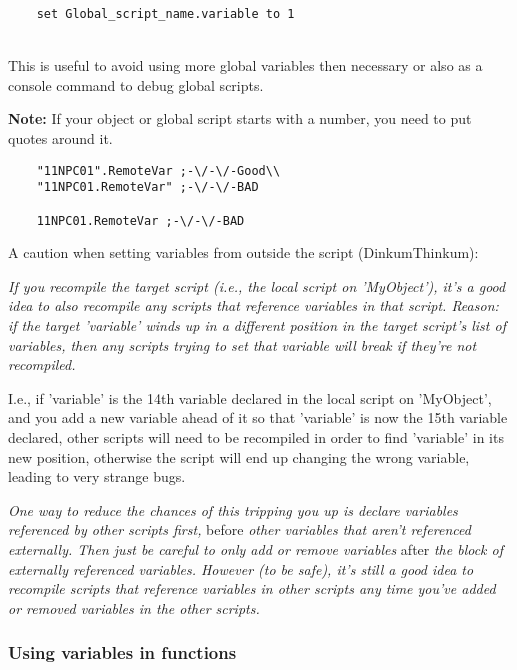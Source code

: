 \begin{lstlisting}
	set Global_script_name.variable to 1
\end{lstlisting}

\strut \\
This is useful to avoid using more global variables then necessary or
also as a console command to debug global scripts.

\textbf{Note:} If your object or global script starts with a number, you
need to put quotes around it.

\begin{lstlisting}
	"11NPC01".RemoteVar ;-\/-\/-Good\\
	"11NPC01.RemoteVar" ;-\/-\/-BAD
	
	11NPC01.RemoteVar ;-\/-\/-BAD
\end{lstlisting}

A caution when setting variables from outside the script
(DinkumThinkum):

\emph{If you recompile the target script (i.e., the local script on
'MyObject'), it's a good idea to also recompile any scripts that
reference variables in that script. Reason: if the target 'variable'
winds up in a different position in the target script's list of
variables, then any scripts trying to set that variable will break if
they're not recompiled.}

I.e., if 'variable' is the 14th variable declared in the local script on
'MyObject', and you add a new variable ahead of it so that 'variable' is
now the 15th variable declared, other scripts will need to be recompiled
in order to find 'variable' in its new position, otherwise the script
will end up changing the wrong variable, leading to very strange bugs.

\emph{One way to reduce the chances of this tripping you up is declare
variables referenced by other scripts first,} before \emph{other
variables that aren't referenced externally. Then just be careful to
only add or remove variables} after \emph{the block of externally
referenced variables. However (to be safe), it's still a good idea to
recompile scripts that reference variables in other scripts any time
you've added or removed variables in the other scripts.}

\hypertarget{using-variables-in-functions}{%
\subsubsection{Using variables in
functions}\label{using-variables-in-functions}}

